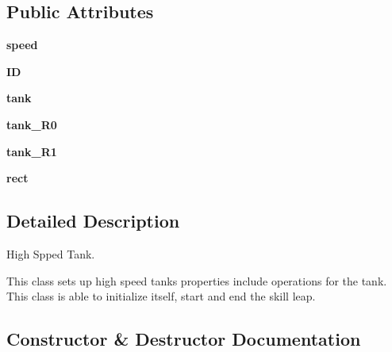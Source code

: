 \subsection*{Public Attributes}
\begin{DoxyCompactItemize}
\item 
\mbox{\label{classhigh_speed_tank_1_1high_speed_tank_a94a8bc8e5c1ed86ed902379ea5d4976f}} 
{\bfseries speed}
\item 
\mbox{\label{classhigh_speed_tank_1_1high_speed_tank_ade6fdfa18fcf6c1e7d4ef10de8fbb652}} 
{\bfseries ID}
\item 
\mbox{\label{classhigh_speed_tank_1_1high_speed_tank_a8be4b4d50f27112c44eab76833f39b60}} 
{\bfseries tank}
\item 
\mbox{\label{classhigh_speed_tank_1_1high_speed_tank_a9100880903b42e1c2c6f2f2f6acfad2c}} 
{\bfseries tank\+\_\+\+R0}
\item 
\mbox{\label{classhigh_speed_tank_1_1high_speed_tank_a82e75620f51d37d7d17531f61f3a29b7}} 
{\bfseries tank\+\_\+\+R1}
\item 
\mbox{\label{classhigh_speed_tank_1_1high_speed_tank_ad39dd65e2a1d42bfe4f2146f44f0ece2}} 
{\bfseries rect}
\end{DoxyCompactItemize}


\subsection{Detailed Description}
High Spped Tank. 

This class sets up high speed tank\textquotesingle{}s properties include operations for the tank. This class is able to initialize itself, start and end the skill leap. 

\subsection{Constructor \& Destructor Documentation}
\mbox{\label{classhigh_speed_tank_1_1high_speed_tank_a43291c342249322293d1c8de585f6923}} 
